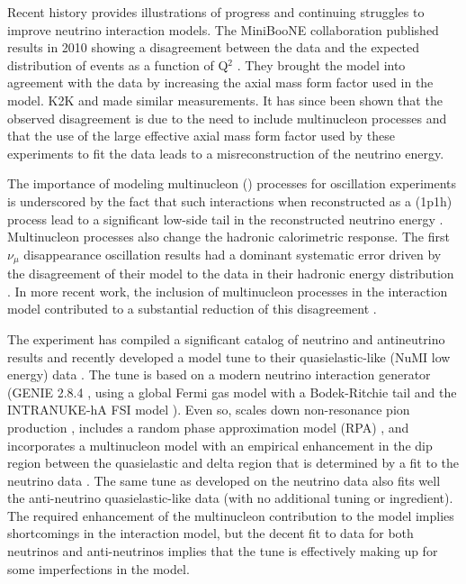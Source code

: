 Recent history provides illustrations of progress and continuing struggles to improve neutrino interaction models.  The MiniBooNE collaboration published results in 2010 showing a disagreement between the data and the expected distribution of  events as a function of Q$^{2}$ \cite{AguilarArevalo:2010cx,Gran:2006jn}.   They brought the model into agreement with the data by increasing the axial mass form factor used in the model.  K2K \cite{Gran:2006jn} and  \cite{Adamson:2014pgc} made similar measurements.  It has since been shown that the observed disagreement is due to the need to include multinucleon processes and that the use of the large effective axial mass form factor used by these experiments to fit the data leads to a misreconstruction of the neutrino energy.  

The importance of modeling multinucleon () processes for oscillation experiments is underscored by the fact that such interactions when reconstructed as a  (1p1h) process lead to a significant low-side tail in the reconstructed neutrino energy \cite{Martini:2012uc}.  Multinucleon processes also change the hadronic calorimetric response.  The first    $\nu_{\mu}$ disappearance oscillation results had a dominant systematic error driven by the disagreement of their model to the data in their hadronic energy distribution \cite{Adamson:2016xxw}.  In more recent work, the inclusion of multinucleon processes in the interaction model contributed to a substantial reduction of this disagreement \cite{NOvA:2018gge}.

The  experiment has compiled a significant catalog of neutrino and antineutrino results and recently developed a model tune to their quasielastic-like  (NuMI low energy) data \cite{Ruterbories:2018gub}.  The tune is based on a modern neutrino interaction generator (GENIE 2.8.4 \cite{Andreopoulos:2009rq}, using a global Fermi gas model \cite{Smith:1972xh}  with a Bodek-Ritchie tail \cite{Bodek:1981wr} and the INTRANUKE-hA FSI model \cite{Dytman:2007zz}).  Even so,  scales down non-resonance pion production \cite{Rodrigues:2016xjj}, includes a random phase approximation model (RPA) \cite{Nieves:2004wx,Gran:2017psn}, and incorporates a multinucleon model \cite{Nieves:2011pp, Gran:2013kda, Schwehr:2016pvn} with an empirical enhancement in the dip region between the quasielastic and delta region that is determined by a fit to the neutrino data \cite{Ruterbories:2018gub}.  The same tune as developed on the neutrino data also fits well the  anti-neutrino quasielastic-like data (with no additional tuning or ingredient).  The required enhancement of the multinucleon contribution to the model implies shortcomings in the interaction model, but the decent fit to data for both neutrinos and anti-neutrinos implies that the tune is effectively making up for some imperfections in the model. 

